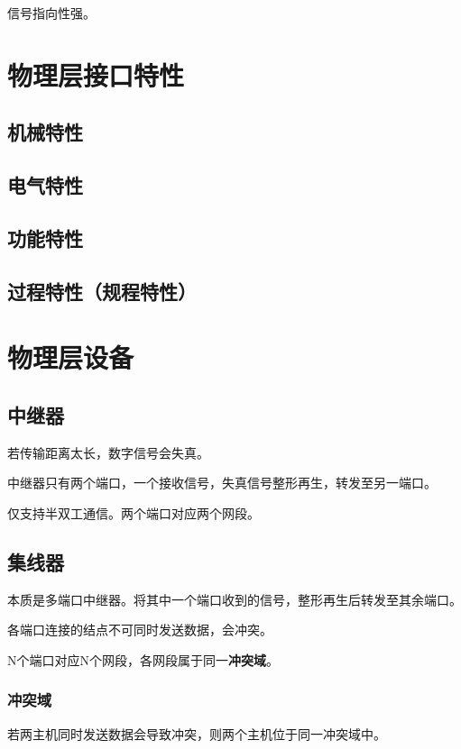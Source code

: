 信号指向性强。


\section{物理层接口特性}

\subsection{机械特性}


\subsection{电气特性}


\subsection{功能特性}


\subsection{过程特性（规程特性）}


\section{物理层设备}

\subsection{中继器}
若传输距离太长，数字信号会失真。

中继器只有两个端口，一个接收信号，失真信号整形再生，转发至另一端口。

仅支持半双工通信。两个端口对应两个网段。


\subsection{集线器}
本质是多端口中继器。将其中一个端口收到的信号，整形再生后转发至其余端口。

各端口连接的结点不可同时发送数据，会冲突。

N个端口对应N个网段，各网段属于同一\textbf{冲突域}。


\subsubsection{冲突域}
若两主机同时发送数据会导致冲突，则两个主机位于同一冲突域中。

